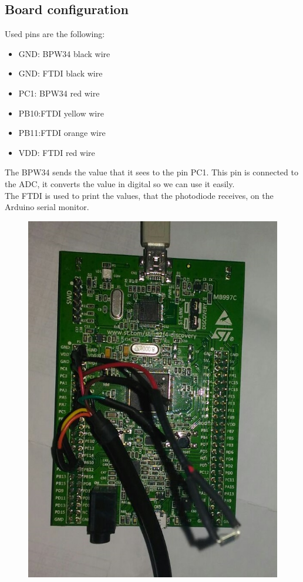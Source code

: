 \documentclass[18pt,oneside,a4paper,titlepage]{article}
\begin{document}
	\subsection{Board configuration}
	Used pins are the following:
		\begin{itemize}
			\item GND: BPW34 black wire 
			\item GND: FTDI black wire
			\item PC1: BPW34 red wire 
			\item PB10:FTDI yellow wire 
			\item PB11:FTDI orange wire  
			\item VDD: FTDI red wire 
		\end{itemize}
		The BPW34 sends the value that it sees to the pin PC1. This pin is connected to the ADC, it converts the value in digital so we can use it easily.\\ The FTDI is used to print the values, that the photodiode receives, on the Arduino serial monitor.
	\begin{figure}[h]
		\centering
		\includegraphics[scale=0.6]{boardLinked.jpeg}
	\end{figure}
	\newpage
\end{document}
